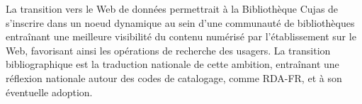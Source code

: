 La transition vers le Web de données permettrait à la Bibliothèque Cujas de s'inscrire dans un noeud dynamique au sein d'une communauté de bibliothèques entraînant une meilleure visibilité du contenu numérisé par l'établissement sur le Web, favorisant ainsi les opérations de recherche des usagers. La transition bibliographique est la traduction nationale de cette ambition, entraînant une réflexion nationale autour des codes de catalogage, comme \ac{RDA-FR}, et à son éventuelle adoption.